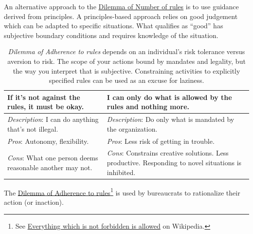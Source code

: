 An alternative approach to the  \href{table:number-of-rules}{Dilemma of Number of rules}
is to use guidance derived from principles. A principles-based approach relies on good judgement which can be adapted to specific situations. What qualifies as ``good'' has subjective boundary conditions and requires knowledge of the situation.



\begin{center}
\begin{table}[H] %
\begin{tabular}{ | m{\dilemmatablewidth}| m{\dilemmatablewidth} | } 
  \hline
  \textbf{If it's not against the rules, it must be okay.} & 
  \textbf{I can only do what is allowed by the rules and nothing more.} \\ 
  \hline
  \textit{Description}: I can do anything that's not illegal. &
  \textit{Description}: Do only what is mandated by the organization. \\
  \hline
  \textit{Pros}: Autonomy, flexibility. &
  \textit{Pros}: Less risk of getting in trouble. \\
  \hline
  \textit{Cons}: What one person deems reasonable another may not. & 
  \textit{Cons}: Constrains creative solutions. Less productive. Responding to novel situations is inhibited. \\  
  \hline
\end{tabular}
\caption{
\textit{Dilemma of Adherence to rules} depends on an individual's risk tolerance versus aversion to risk. 
The scope of your actions bound by mandates and legality, but the way you interpret that is subjective. 
Constraining activities to explicitly specified rules can be used as an excuse for laziness. 
}
\label{table:rule-adherence}
\end{table}
\end{center}


The \href{table:rule-adherence}{Dilemma of Adherence to rules}\footnote{See \href{https://en.wikipedia.org/wiki/Everything_which_is_not_forbidden_is_allowed}{Everything which is not forbidden is allowed} 
on Wikipedia.} is used by bureaucrats to rationalize their action (or inaction). 

